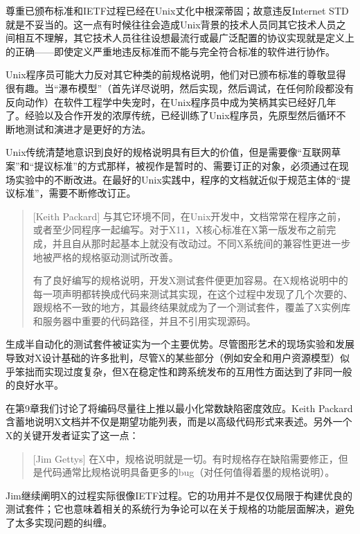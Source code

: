 \documentclass[12pt,oneside]{book}
\begin{document}
尊重已颁布标准和IETF过程已经在Unix丈化中根深蒂固；故意违反Internet STD就是不妥当的。这一点有时候往往会造成Unix背景的技术人员同其它技术人员之间相互不理解，其它技术人员往往设想最流行或最广泛配置的协议实现就是定义上的正确——即使定义严重地违反标准而不能与完全符合标准的软件进行协作。

Unix程序员可能大力反对其它种类的前规格说明，他们对已颁布标准的尊敬显得很有趣。当“瀑布模型”（首先详尽说明，然后实现，然后调试，在任何阶段都没有反向动作）在软件工程学中失宠时，在Unix程序员中成为笑柄其实已经好几年了。经验以及合作开发的浓厚传统，已经训练了Unix程序员，先原型然后循环不断地测试和演进才是更好的方法。

Unix传统清楚地意识到良好的规格说明具有巨大的价值，但是需要像“互联网草案”和“提议标准”的方式那样，被视作是暂时的、需要订正的对象，必须通过在现场实验中的不断改进。在最好的Unix实践中，程序的文档就近似于规范主体的“提议标准”，需要不断修改订正。

\begin{quote}[Keith Packard]
与其它环境不同，在Unix开发中，文档常常在程序之前，或者至少同程序一起编写。对于X11，X核心标准在X第一版发布之前完成，并且自从那时起基本上就没有改动过。不同X系统间的兼容性更进一步地被严格的规格驱动测试所改善。

有了良好编写的规格说明，开发X测试套件便更加容易。在X规格说明中的每一项声明都转换成代码来测试其实现，在这个过程中发现了几个次要的、跟规格不一致的地方，其最终结果就成为了一个测试套件，覆盖了X实例库和服务器中重要的代码路径，并且不引用实现源码。
\end{quote}

生成半自动化的测试套件被证实为一个主要优势。尽管图形艺术的现场实验和发展导致对X设计基础的许多批判，尽管X的某些部分（例如安全和用户资源模型）似乎笨拙而实现过度复杂，但X在稳定性和跨系统发布的互用性方面达到了非同一般的良好水平。

在第9章我们讨论了将编码尽量往上推以最小化常数缺陷密度效应。Keith Packard含蓄地说明X文档并不仅是期望功能列表，而是以高级代码形式来表述。另外一个X的关键开发者证实了这一点：

\begin{quote}[Jim Gettys]
在X中，规格说明就是一切。有时规格存在缺陷需要修正，但是代码通常比规格说明具备更多的bug（对任何值得着墨的规格说明）。
\end{quote}

Jim继续阐明X的过程实际很像IETF过程。它的功用并不是仅仅局限于构建优良的测试套件；它也意味着相关的系统行为争论可以在关于规格的功能层面解决，避免了太多实现问题的纠缠。
\end{document}
